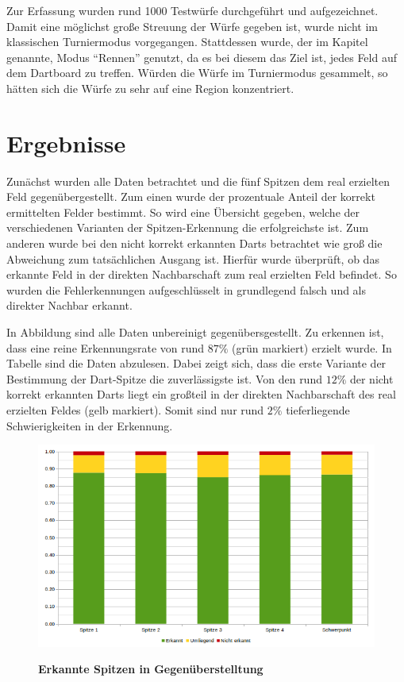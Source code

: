Zur Erfassung wurden rund 1000  Testwürfe durchgeführt und aufgezeichnet. Damit eine möglichst große Streuung der Würfe gegeben ist, wurde nicht im klassischen Turniermodus vorgegangen. Stattdessen wurde, der im Kapitel  genannte, Modus "`Rennen"' genutzt, da es bei diesem das Ziel ist, jedes Feld auf dem Dartboard zu treffen. Würden die Würfe im Turniermodus gesammelt, so hätten sich die Würfe zu sehr auf eine Region konzentriert.


\section*{Ergebnisse}
\label{sec:results}
Zunächst wurden alle Daten betrachtet und die fünf Spitzen dem real erzielten Feld gegenübergestellt. Zum einen wurde der prozentuale Anteil der korrekt ermittelten Felder bestimmt. So wird eine Übersicht gegeben, welche der verschiedenen Varianten der Spitzen-Erkennung die erfolgreichste ist. Zum anderen wurde bei den nicht korrekt erkannten Darts betrachtet wie groß die Abweichung zum tatsächlichen Ausgang ist. Hierfür wurde überprüft, ob das erkannte Feld in der direkten Nachbarschaft zum real erzielten Feld befindet. So wurden die Fehlerkennungen aufgeschlüsselt in grundlegend falsch und als direkter Nachbar erkannt.


In Abbildung   sind alle Daten unbereinigt gegenübersgestellt. Zu erkennen ist, dass eine reine Erkennungsrate von rund $87\%$ (grün markiert) erzielt wurde. In Tabelle  sind die Daten abzulesen. Dabei zeigt sich, dass die erste Variante der Bestimmung der Dart-Spitze die zuverlässigste ist. Von den rund $12\%$ der nicht korrekt erkannten Darts liegt ein großteil in der direkten Nachbarschaft des real erzielten Feldes (gelb markiert). Somit sind nur rund $2\%$ tieferliegende Schwierigkeiten in der Erkennung.
\begin{figure}[ht]
\centering
\includegraphics[width=\textwidth]{media/chartplain}\\
\caption{\textbf{Erkannte Spitzen in Gegenüberstelltung}}
\label{Fig:plainchart}
\end{figure}

